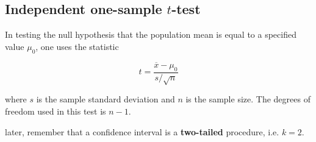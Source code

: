 
\subsection{Independent one-sample $t$-test}
In testing the null hypothesis that the population mean is equal to a specified value $\mu_{0}$, one uses the statistic

\begin{equation}t = \frac{\overline{x} - \mu_0}{s / \sqrt{n}}\end{equation}

where $s$ is the sample standard deviation and $n$ is the sample size. The degrees of freedom used in this test is $n - 1$.





later, remember that a confidence interval is a \textbf{two-tailed} procedure, i.e. $k=2$.

